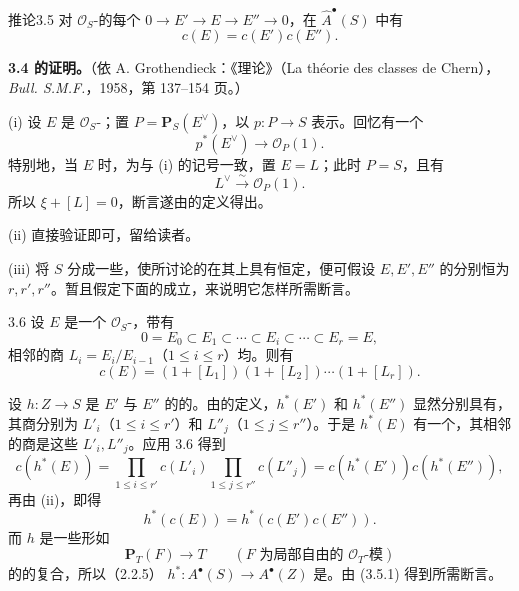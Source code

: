 \begin{SGAresult}{推论}{3.5}
对 $\mathscr O_S$-的每个 $0\to E'\to E\to E''\to0$，在 $\widehat A^\bullet(S)$ 中有
\[
 c(E)=c(E')c(E'').
\]
\end{SGAresult}

\textbf{3.4 的证明。}（依 A. Grothendieck：《理论》（La théorie des classes de Chern），\textit{Bull. S.M.F.}，1958，第 137--154 页。）

(i) 设 $E$ 是 $\mathscr O_S$-；置 $P=\mathbf P_S(E^\vee)$，以 $p:P\to S$ 表示。回忆有一个
\[
 p^*(E^\vee)\longrightarrow\mathscr O_P(1).
\]
特别地，当 $E$ 时，为与 (i) 的记号一致，置 $E=L$；此时 $P=S$，且有
\[
 L^\vee\xrightarrow{\sim}\mathscr O_P(1).
\]
所以 $\xi+[L]=0$，断言遂由的定义得出。

(ii) 直接验证即可，留给读者。

(iii) 将 $S$ 分成一些，使所讨论的在其上具有恒定，便可假设 $E,E',E''$ 的分别恒为 $r,r',r''$。暂且假定下面的成立，来说明它怎样所需断言。

\begin{SGAresult}{}{3.6}
设 $E$ 是一个 $\mathscr O_S$-，带有
\[
 0=E_0\subset E_1\subset\cdots\subset E_i\subset\cdots\subset E_r=E,
\]
相邻的商 $L_i=E_i/E_{i-1}$（$1\le i\le r$）均。则有
\[
 c(E)=(1+[L_1])(1+[L_2])\cdots(1+[L_r]).
\]
\end{SGAresult}
设 $h:Z\to S$ 是 $E'$ 与 $E''$ 的的。由的定义，$h^*(E')$ 和 $h^*(E'')$ 显然分别具有，其商分别为 $L'_i$（$1\le i\le r'$）和 $L''_j$（$1\le j\le r''$）。于是 $h^*(E)$ 有一个，其相邻的商是这些 $L'_i,L''_j$。应用 3.6 得到
\[
 c(h^*(E))=\prod_{1\le i\le r'}c(L'_i)\prod_{1\le j\le r''}c(L''_j)
 =c(h^*(E'))c(h^*(E'')),
\]
再由 (ii)，即得
\[
 h^*(c(E))=h^*(c(E')c(E'')).\tag{3.5.1}
\]
而 $h$ 是一些形如
\[
 \mathbf P_T(F)\longrightarrow T\qquad(F\text{ 为局部自由的 }\mathscr O_T\text{-模})
\]
的的复合，所以（2.2.5） $h^*:A^\bullet(S)\to A^\bullet(Z)$ 是。由 (3.5.1) 得到所需断言。

